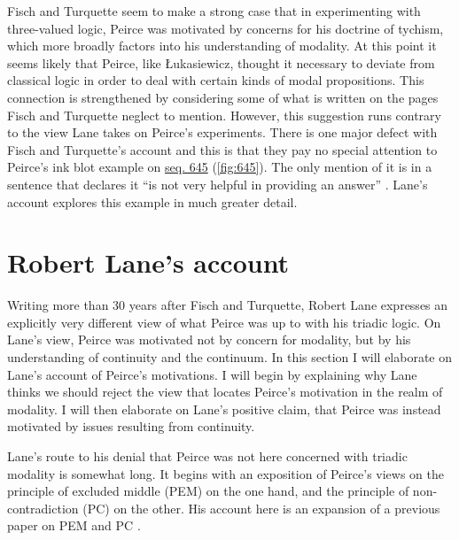 Fisch and Turquette seem to make a strong case that in experimenting with three-valued logic, Peirce was motivated by concerns for his doctrine of tychism, which more broadly factors into his understanding of modality. At this point it seems likely that Peirce, like Łukasiewicz, thought it necessary to deviate from classical logic in order to deal with certain kinds of modal propositions. This connection is strengthened by considering some of what is written on the pages Fisch and Turquette neglect to mention. However, this suggestion runs contrary to the view Lane takes on Peirce's experiments. There is one major defect with Fisch and Turquette's account and this is that they pay no special attention to Peirce's ink blot example on \href{https://iiif.lib.harvard.edu/manifests/view/drs:15255301$645i}{seq. 645} (\ref{fig:645}). The only mention of it is in a sentence that declares it ``is not very helpful in providing an answer'' \citep{fisch_peirces_1966}. Lane's account explores this example in much greater detail.

\section{Robert Lane's account}

Writing more than 30 years after Fisch and Turquette, Robert Lane expresses an explicitly very different view of what Peirce was up to with his triadic logic. On Lane's view, Peirce was motivated not by concern for modality, but by his understanding of continuity and the continuum. In this section I will elaborate on Lane's account of Peirce's motivations. I will begin by explaining why Lane thinks we should reject the view that locates Peirce's motivation in the realm of modality. I will then elaborate on Lane's positive claim, that Peirce was instead motivated by issues resulting from continuity.

Lane's route to his denial that Peirce was not here concerned with triadic modality is somewhat long. It begins with an exposition of Peirce's views on the principle of excluded middle (PEM) on the one hand, and the principle of non-contradiction (PC) on the other. His account here is an expansion of a previous paper on PEM and PC \citep{lane_peirces_1999}.

